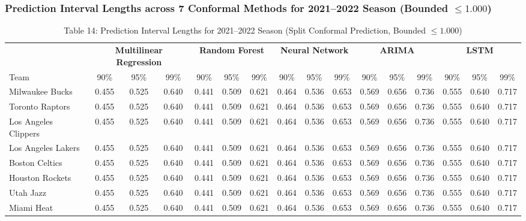 \documentclass[11pt,a4paper]{article}
\begin{document}
\subsubsection{Prediction Interval Lengths across 7 Conformal Methods for 2021--2022 Season (Bounded $\le 1.000$)}

\begin{table}[H]
\centering
\caption{Table 14: Prediction Interval Lengths for 2021--2022 Season (Split Conformal Prediction, Bounded $\le 1.000$)}
\label{tab:team_table14}
\tiny
\setlength{\tabcolsep}{1.5pt}
\begin{tabular}{l ccc ccc ccc ccc ccc}
\toprule
 & \multicolumn{3}{c}{\textbf{Multilinear Regression}} & \multicolumn{3}{c}{\textbf{Random Forest}} & \multicolumn{3}{c}{\textbf{Neural Network}} & \multicolumn{3}{c}{\textbf{ARIMA}} & \multicolumn{3}{c}{\textbf{LSTM}} \\
\cmidrule(lr){2-4} \cmidrule(lr){5-7} \cmidrule(lr){8-10} \cmidrule(lr){11-13} \cmidrule(lr){14-16}
Team & 90\% & 95\% & 99\% & 90\% & 95\% & 99\% & 90\% & 95\% & 99\% & 90\% & 95\% & 99\% & 90\% & 95\% & 99\% \\
\midrule
Milwaukee Bucks & 0.455 & 0.525 & 0.640 & 0.441 & 0.509 & 0.621 & 0.464 & 0.536 & 0.653 & 0.569 & 0.656 & 0.736 & 0.555 & 0.640 & 0.717 \\
Toronto Raptors & 0.455 & 0.525 & 0.640 & 0.441 & 0.509 & 0.621 & 0.464 & 0.536 & 0.653 & 0.569 & 0.656 & 0.736 & 0.555 & 0.640 & 0.717 \\
Los Angeles Clippers & 0.455 & 0.525 & 0.640 & 0.441 & 0.509 & 0.621 & 0.464 & 0.536 & 0.653 & 0.569 & 0.656 & 0.736 & 0.555 & 0.640 & 0.717 \\
Los Angeles Lakers & 0.455 & 0.525 & 0.640 & 0.441 & 0.509 & 0.621 & 0.464 & 0.536 & 0.653 & 0.569 & 0.656 & 0.736 & 0.555 & 0.640 & 0.717 \\
Boston Celtics & 0.455 & 0.525 & 0.640 & 0.441 & 0.509 & 0.621 & 0.464 & 0.536 & 0.653 & 0.569 & 0.656 & 0.736 & 0.555 & 0.640 & 0.717 \\
Houston Rockets & 0.455 & 0.525 & 0.640 & 0.441 & 0.509 & 0.621 & 0.464 & 0.536 & 0.653 & 0.569 & 0.656 & 0.736 & 0.555 & 0.640 & 0.717 \\
Utah Jazz & 0.455 & 0.525 & 0.640 & 0.441 & 0.509 & 0.621 & 0.464 & 0.536 & 0.653 & 0.569 & 0.656 & 0.736 & 0.555 & 0.640 & 0.717 \\
Miami Heat & 0.455 & 0.525 & 0.640 & 0.441 & 0.509 & 0.621 & 0.464 & 0.536 & 0.653 & 0.569 & 0.656 & 0.736 & 0.555 & 0.640 & 0.717 \\

\end{tabular}
\end{table}
\end{document}

